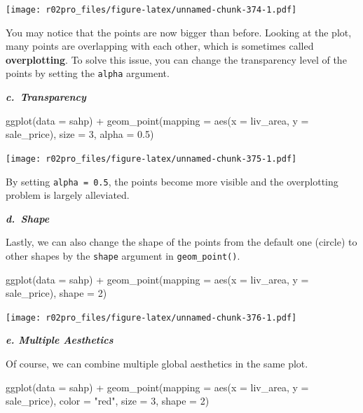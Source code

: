 \documentclass[
]{book}
\newenvironment{Shaded}{\begin{snugshade}}{\end{snugshade}}
\newcommand{\AttributeTok}[1]{\textcolor[rgb]{0.77,0.63,0.00}{#1}}
\newcommand{\DecValTok}[1]{\textcolor[rgb]{0.00,0.00,0.81}{#1}}
\newcommand{\FloatTok}[1]{\textcolor[rgb]{0.00,0.00,0.81}{#1}}
\newcommand{\FunctionTok}[1]{\textcolor[rgb]{0.00,0.00,0.00}{#1}}
\newcommand{\NormalTok}[1]{#1}
\newcommand{\SpecialCharTok}[1]{\textcolor[rgb]{0.00,0.00,0.00}{#1}}
\newcommand{\StringTok}[1]{\textcolor[rgb]{0.31,0.60,0.02}{#1}}
\begin{document}
\texttt{[image: r02pro\_files/figure-latex/unnamed-chunk-374-1.pdf]}

You may notice that the points are now bigger than before. Looking at the plot, many points are overlapping with each other, which is sometimes called \textbf{overplotting}. To solve this issue, you can change the transparency level of the points by setting the \texttt{alpha} argument.

\textbf{\emph{c.~Transparency}}

\begin{Shaded}
\begin{Highlighting}[]
\FunctionTok{ggplot}\NormalTok{(}\AttributeTok{data =}\NormalTok{ sahp) }\SpecialCharTok{+} \FunctionTok{geom\_point}\NormalTok{(}\AttributeTok{mapping =} \FunctionTok{aes}\NormalTok{(}\AttributeTok{x =}\NormalTok{ liv\_area, }\AttributeTok{y =}\NormalTok{ sale\_price), }\AttributeTok{size =} \DecValTok{3}\NormalTok{, }\AttributeTok{alpha =} \FloatTok{0.5}\NormalTok{)}
\end{Highlighting}
\end{Shaded}

\texttt{[image: r02pro\_files/figure-latex/unnamed-chunk-375-1.pdf]}

By setting \texttt{alpha\ =\ 0.5}, the points become more visible and the overplotting problem is largely alleviated.

\textbf{\emph{d.~Shape}}

Lastly, we can also change the shape of the points from the default one (circle) to other shapes by the \texttt{shape} argument in \texttt{geom\_point()}.

\begin{Shaded}
\begin{Highlighting}[]
\FunctionTok{ggplot}\NormalTok{(}\AttributeTok{data =}\NormalTok{ sahp) }\SpecialCharTok{+} \FunctionTok{geom\_point}\NormalTok{(}\AttributeTok{mapping =} \FunctionTok{aes}\NormalTok{(}\AttributeTok{x =}\NormalTok{ liv\_area, }\AttributeTok{y =}\NormalTok{ sale\_price), }\AttributeTok{shape =} \DecValTok{2}\NormalTok{)}
\end{Highlighting}
\end{Shaded}

\texttt{[image: r02pro\_files/figure-latex/unnamed-chunk-376-1.pdf]}

\textbf{\emph{e. Multiple Aesthetics}}

Of course, we can combine multiple global aesthetics in the same plot.

\begin{Shaded}
\begin{Highlighting}[]
\FunctionTok{ggplot}\NormalTok{(}\AttributeTok{data =}\NormalTok{ sahp) }\SpecialCharTok{+} \FunctionTok{geom\_point}\NormalTok{(}\AttributeTok{mapping =} \FunctionTok{aes}\NormalTok{(}\AttributeTok{x =}\NormalTok{ liv\_area, }\AttributeTok{y =}\NormalTok{ sale\_price), }\AttributeTok{color =} \StringTok{"red"}\NormalTok{, }\AttributeTok{size =} \DecValTok{3}\NormalTok{, }\AttributeTok{shape =} \DecValTok{2}\NormalTok{)}
\end{Highlighting}
\end{Shaded}
\end{document}
